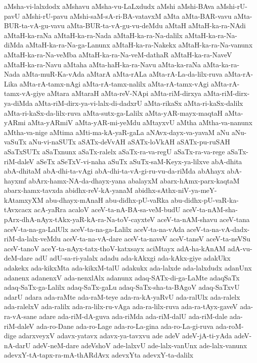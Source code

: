 {aMsha-vi-lalxdodx
aMshavu
aMsha-vu-LaLxdudx
aMshi
aMshi-BAva
aMshi-rU-pavU
aMshi-rU-pavu
aMshi-saM-sA-ri-BA-vatavxM
aMta
aMta-BAR-vavu
aMta-BUR-ta-vA-gu-vavu
aMta-BUR-ta-vA-gu-vu-deMdu
aMtaH
aMtaH-ka-ra-NAdi
aMtaH-ka-raNa
aMtaH-ka-ra-Nada
aMtaH-ka-ra-Na-dalilx
aMtaH-ka-ra-Na-diMda
aMtaH-ka-ra-Na-ga-Lanunx
aMtaH-ka-ra-Nakekx
aMtaH-ka-ra-Na-vanunx
aMtaH-ka-ra-Na-veMba
aMtaH-ka-ra-Na-veM-dathaR
aMtaH-ka-ra-NaveV
aMtaH-ka-ra-Navu
aMtaha
aMta-haH-ka-ra-Navu
aMta-ka-raNa
aMta-ka-ra-Nada
aMta-muR-Ka-vAda
aMtarA
aMta-rALa
aMta-rA-La-da-lilx-ruva
aMta-rA-Lika
aMta-rA-tamx-nAgi
aMta-rA-tamx-nalilx
aMta-rA-tamx-vAgi
aMta-rA-tamx-vA-giye
aMtara
aMtaraH
aMta-reV-NApi
aMta-riM-dirxya
aMta-riM-dirx-ya-diMda
aMta-riM-dirx-ya-vi-lalx-di-dadxrU
aMta-rikaSx
aMta-ri-kaSx-dalilx
aMta-ri-kaSx-da-lilx-ruva
aMta-sutx-ga-Lalilx
aMta-yAR-mayx-maqtaH
aMta-yARmi
aMta-yARmiV
aMta-yAR-mi-yeMdu
aMtayxvU
aMtha
aMtha-va-nanunx
aMtha-va-nige
aMtima
aMti-ma-kA-yaR-gaLa
aNAvx-dayx-va-yavaM
aNu
aNu-vaSuTx
aNu-vi-naSUTx
aSATx-deVvAH
aSATx-loVkAH
aSATx-pu-ruSAH
aSaTxSUTx
aSaTxnunx
aSaTx-ralelx
aSaTx-ra-va-regU
aSaTx-ra-va-rege
aSaTx-riM-daleV
aSeTx
aSeTxV-vi-naha
aSuTx
aSuTx-saM-Keyx-ya-lilxve
abA-dhita
abA-dhitaM
abA-dhi-ta-vAgi
abA-dhi-ta-vA-gi-ru-vu-da-riMda
abAhayx
abA-hayxmf
abArx-hamx-NA-da-dhayx-yana
abalayxM
abarx-hAmx-parx-kaqtaM
abarx-hamx-tavxda
abidhx-reV-kA-yanaM
abidhx-sAthx-niV-ya-meY-kAtamxyXM
abu-dhayx-mAnaH
abu-didhx-pU-vaRka
abu-didhx-pU-vaR-ka-tAvxcacx
acA-yaRra
acaloV
aceV-ta-nA-BA-sa-veM-budU
aceV-ta-nAM-sha-pArx-dhA-nAyx-tAkx-yaR-kA-ra-Na-toV-cayxteV
aceV-ta-nAM-shavu
aceV-tana
aceV-ta-na-ga-LalUlx
aceV-ta-na-ga-Lalilx
aceV-ta-na-vAda
aceV-ta-na-vA-dadx-riM-da-lalx-veMdu
aceV-ta-na-vA-dare
aceV-ta-naveV
aceV-taneV
aceV-ta-neVSu
aceV-tanoV
aceY-ta-nAyx-tatx-thoV-katxsayx
aciMtayx
adA-ha-kAnAM
adA-vu-deM-dare
adU
adU-sa-ri-yalalx
adadu
ada-kAkxgi
ada-kAkx-giye
adakUkx
adakekx
ada-kikxMta
ada-kikxM-talU
adakukx
ada-lalxde
ada-lalxdudx
adanUnx
adanenx
adanenxV
ada-nenxlAlx
adanunx
adaq-SATx-di-ga-LaMte
adaqSaTx
adaq-SaTx-ga-Lalilx
adaq-SaTx-gaLu
adaq-SaTx-sha-ta-BAgoV
adaq-SaTxvU
adarU
adara
ada-raMte
ada-raM-teye
ada-ra-kA-yaRvU
ada-ralUlx
ada-ralelx
ada-ralelxV
ada-ralilx
ada-ra-lilx-ru-vAga
ada-ra-lilx-ruva
ada-ra-tAyx-gaveV
ada-ra-vA-sane
adare
ada-riM-dA-guva
ada-riMda
ada-riM-dalU
ada-riM-dale
ada-riM-daleV
ada-ro-Dane
ada-ro-Lage
ada-ro-La-gina
ada-ro-La-gi-ruva
ada-roM-dige
adarxveyxV
adavx-yatavx
adavx-ya-tavxvu
ade
adeV
adeV-jA-ti-yAda
adeV-nA-darU
adeV-neM-dare
adeVshoV
ade-lalxvU
ade-lalx-vanUnx
ade-lalx-vanunx
adevxY-tA-tapx-ra-mA-thARdAvx
adevxYta
adevxY-ta-dalilx
}
